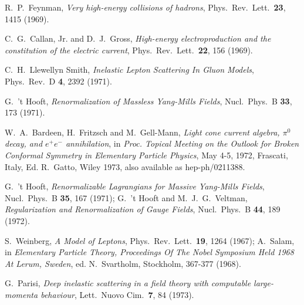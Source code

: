 \documentclass[12pt]{article} %
\begin{document}
\begin{thebibliography}{9}
R.~P.~Feynman,
{\it Very high-energy collisions of hadrons},
  Phys.\ Rev.\ Lett.\  {\bf 23}, 1415 (1969).

C.~G.~Callan, Jr. and D.~J.~Gross,
{\it High-energy electroproduction and the constitution of the electric current},
  Phys.\ Rev.\ Lett.\  {\bf 22}, 156 (1969).

C.~H.~Llewellyn Smith,
{\it Inelastic Lepton Scattering In Gluon Models},
  Phys.\ Rev.\ D {\bf 4}, 2392 (1971).

G.~'t Hooft,
{\it Renormalization of Massless Yang-Mills Fields},
  Nucl.\ Phys.\ B {\bf 33}, 173 (1971).

W.~A.~Bardeen, H.~Fritzsch and M.~Gell-Mann,
{\it Light cone current algebra, $\pi^0$ decay, and $e^+ e^-$ annihilation},
in {\it Proc. Topical Meeting on the Outlook for Broken Conformal Symmetry in Elementary Particle Physics},
May 4-5, 1972, Frascati, Italy, Ed. R.~Gatto, Wiley 1973, also available as hep-ph/0211388.
  
G.~'t Hooft,
{\it Renormalizable Lagrangians for Massive Yang-Mills Fields},
  Nucl.\ Phys.\ B {\bf 35}, 167 (1971);
G.~'t Hooft and M.~J.~G.~Veltman,
{\it Regularization and Renormalization of Gauge Fields},
  Nucl.\ Phys.\ B {\bf 44}, 189 (1972).
  
S.~Weinberg,
{\it A Model of Leptons},
  Phys.\ Rev.\ Lett.\  {\bf 19}, 1264 (1967);
A.~Salam, in {\it Elementary Particle Theory, Proceedings Of The Nobel Symposium Held 1968 At Lerum, Sweden},
ed. N.~Svartholm, Stockholm, 367-377 (1968).

G.~Parisi,
{\it Deep inelastic scattering in a field theory with computable large-momenta behaviour},
Lett.\ Nuovo Cim.\  {\bf 7}, 84 (1973).


\end{thebibliography}
\end{document}
